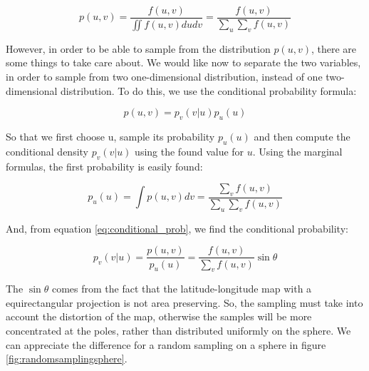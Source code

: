 $$
p(u,v) = \frac{f(u,v)}{ \displaystyle\iint f(u,v) du dv} = \frac{f(u,v)}{ \displaystyle\sum_u \sum_v f(u,v)}
$$

However, in order to be able to sample from the distribution $p(u,v)$, there are some things to take care about. We would like now to separate the two variables, in order to sample from two one-dimensional distribution, instead of one two-dimensional distribution. To do this, we use the conditional probability formula:

$$
p(u,v) = p_v(v|u) p_u(u)
\label{eq:conditional_prob}
$$

So that we first choose u, sample its probability $p_u(u)$ and then compute the conditional density $p_v(v|u)$ using the found value for $u$. Using the marginal formulas, the first probability is easily found:

$$
p_u(u) =\int p(u,v) dv = \frac{ \displaystyle\sum_v f(u,v)}{ \displaystyle\sum_u \sum_v f(u,v)}
$$

And, from equation \ref{eq:conditional_prob}, we find the conditional probability:

$$
p_v(v|u) = \frac{p(u,v)}{p_u(u)} = \frac{f(u,v)}{ \displaystyle\sum_v f(u,v)} \sin \theta
$$

The $\sin \theta$ comes from the fact that the latitude-longitude map with a equirectangular projection is not area preserving. So, the sampling must take into account the distortion of the map, otherwise the samples will be more concentrated at the poles, rather than distributed uniformly on the sphere. We can appreciate the difference for a random sampling on a sphere in figure \ref{fig:randomsamplingsphere}.


